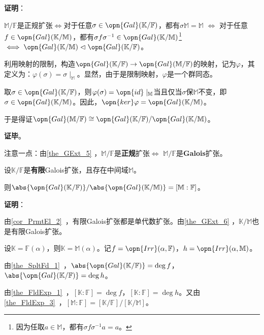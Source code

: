 \textbf{证明}：

$\mathbb{M}/\mathbb{F}$是正规扩张$\iff$对于任意$\sigma\in\opn{Gal}(\mathbb{K}/\mathbb{F})$，都有$\sigma\mathbb{M}=\mathbb{M}$ $\iff$ 对于任意$f\in\opn{Gal}(\mathbb{K}/\mathbb{M})$，都有$\sigma f \sigma^{-1}\in\opn{Gal}(\mathbb{K}/\mathbb{M})$\footnote{因为任取$a\in\mathbb{M}$，都有$\sigma f \sigma^{-1} a=a$。} $\iff\opn{Gal}(\mathbb{K/\mathbb{M}})\vartriangleleft\opn{Gal}(\mathbb{K/\mathbb{F}})$。

利用映射的限制，构造$\opn{Gal}(\mathbb{K}/\mathbb{F})\to\opn{Gal}(\mathbb{M}/\mathbb{F})$的映射，记为$\varphi$，其定义为：$\varphi(\sigma) = \sigma\mid_{\mathbb{M}}$。显然，由于是限制映射，$\varphi$是一个群同态。

取$\sigma\in\opn{Gal}(\mathbb{K}/\mathbb{F})$，则$\varphi(\sigma)=\opn{id}\mid_{\mathbb{M}}$当且仅当$\sigma$保$\mathbb{M}$不变，即$\sigma\in\opn{Gal}(\mathbb{K}/\mathbb{M})$。因此，$\opn{ker}\varphi=\opn{Gal}(\mathbb{K}/\mathbb{M})$。

于是得证$\opn{Gal}(\mathbb{M}/\mathbb{F})\cong \opn{Gal}(\mathbb{K}/\mathbb{F})/\opn{Gal}(\mathbb{K}/\mathbb{M})$。


\textbf{证毕}。


注意一点：由\autoref{the_GExt_5} ，$\mathbb{M}/\mathbb{F}$是\textbf{正规}扩张$\iff$ $\mathbb{M}/\mathbb{F}$是\textbf{Galois}扩张。



\begin{theorem}{}\label{the_GExt_9}
设$\mathbb{K}/\mathbb{F}$是\textbf{有限}Galois扩张，且存在中间域$\mathbb{M}$。

则$\abs{\opn{Gal}(\mathbb{K}/\mathbb{F})}/\abs{\opn{Gal}(\mathbb{K}/\mathbb{M})}=[\mathbb{M}:\mathbb{F}]$。
\end{theorem}

\textbf{证明}：

由\autoref{cor_PrmtEl_2}~，有限Galois扩张都是单代数扩张。由\autoref{the_GExt_6} ，$\mathbb{K}/\mathbb{M}$也是有限Galois扩张。

设$\mathbb{K}=\mathbb{F}(\alpha)$，则$\mathbb{K}=\mathbb{M}(\alpha)$。记$f=\opn{Irr}(\alpha, \mathbb{F})$，$h=\opn{Irr}(\alpha, \mathbb{M})$。

由\autoref{the_SpltFd_1}~，$\abs{\opn{Gal}(\mathbb{K}/\mathbb{F})}=\deg f$，$\abs{\opn{Gal}(\mathbb{K}/\mathbb{F})}=\deg h$。

由\autoref{the_FldExp_1}~，$[\mathbb{K}:\mathbb{F}]=\deg f$，$[\mathbb{K}:\mathbb{F}]=\deg h$。又由\autoref{the_FldExp_3}~，$[\mathbb{M}:\mathbb{F}]=[\mathbb{K}/\mathbb{F}]/[\mathbb{K}/\mathbb{M}]$。

